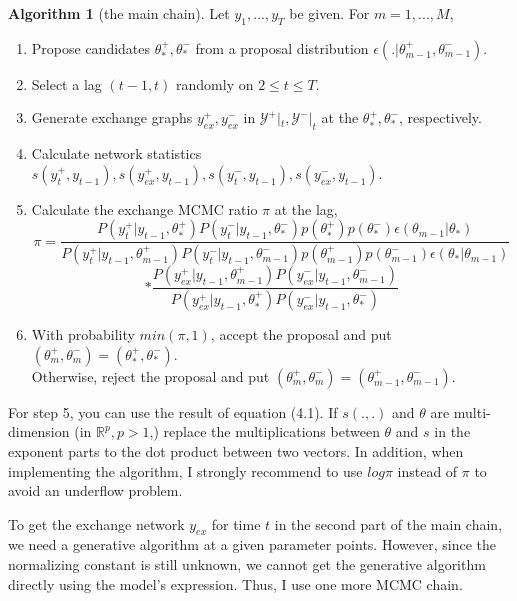 \documentclass[a4paper, 11pt]{report}
\theoremstyle{definition}
\newtheorem{algo}{Algorithm}[section]
\begin{document}
\clearpage
\begin{algo}[the main chain]
Let $y_1,...,y_T$ be given. For $m=1,...,M$,
\begin{enumerate}
    \item Propose candidates $\theta_*^+,\theta_*^-$ from a proposal distribution $\epsilon(.|\theta_{m-1}^+,\theta_{m-1}^-)$.
    \item Select a lag $(t-1,t)$ randomly on $2 \leq t \leq T$.
    \item Generate exchange graphs $y_{ex}^+, y_{ex}^-$ in $\mathcal{Y}^+|_t, \mathcal{Y}^-|_t$ at the $\theta_*^+,\theta_*^-$, respectively.
    \item Calculate network statistics $s(y_t^+,y_{t-1}), s(y_{ex}^+,y_{t-1}), s(y_t^-,y_{t-1}), s(y_{ex}^-,y_{t-1})$.
    \item Calculate the exchange MCMC ratio $\pi$ at the lag,
        \[\pi = \frac{P(y_t^+|y_{t-1},\theta_*^+)P(y_t^-|y_{t-1},\theta_*^-)p(\theta_*^+)p(\theta_*^-)\epsilon(\theta_{m-1}|\theta_*)}
            {P(y_t^+|y_{t-1},\theta_{m-1}^+)P(y_t^-|y_{t-1},\theta_{m-1}^-)p(\theta_{m-1}^+)p(\theta_{m-1}^-)\epsilon(\theta_*|\theta_{m-1})} \]
        \[* \frac{P(y_{ex}^+|y_{t-1},\theta_{m-1}^+)P(y_{ex}^-|y_{t-1},\theta_{m-1}^-)}{P(y_{ex}^+|y_{t-1},\theta_*^+)P(y_{ex}^-|y_{t-1},\theta_*^-)}\]
    \item With probability $min(\pi,1)$, accept the proposal and put $(\theta_m^+,\theta_m^-) = (\theta_*^+,\theta_*^-)$.\\
        Otherwise, reject the proposal and put $(\theta_m^+,\theta_m^-) = (\theta_{m-1}^+,\theta_{m-1}^-)$.
\end{enumerate}
\end{algo}    

For step 5, you can use the result of equation (4.1). If $s(.,.)$ and $\theta$ are multi-dimension (in $\mathbb{R}^p, p>1$,) 
replace the multiplications between $\theta$ and $s$ in the exponent parts to the dot product between two vectors.
In addition, when implementing the algorithm, I strongly recommend to use $log\pi$ instead of $\pi$ to avoid an underflow problem.

To get the exchange network $y_{ex}$ for time $t$ in the second part of the main chain, 
we need a generative algorithm at a given parameter points. 
However, since the normalizing constant is still unknown, 
we cannot get the generative algorithm directly using the model's expression. 
Thus, I use one more MCMC chain.
\end{document}
